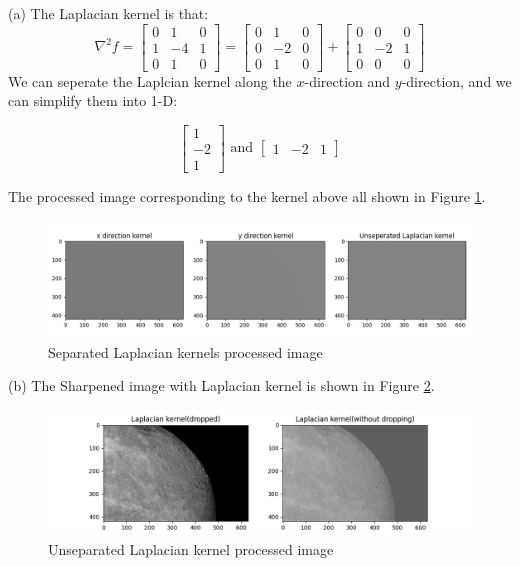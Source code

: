 \problem{}
(a) The Laplacian kernel is that:
$$
\nabla^2 f = \begin{bmatrix}
    0 & 1 & 0 \\
    1 & -4 & 1 \\
    0 & 1 & 0
\end{bmatrix}
=
\begin{bmatrix}
    0 & 1 & 0 \\
    0 & -2 & 0 \\
    0 & 1 & 0
\end{bmatrix}
+
\begin{bmatrix}
    0 & 0 & 0 \\
    1 & -2 & 1 \\
    0 & 0 & 0
\end{bmatrix}
$$
We can seperate the Laplcian kernel along the $x$-direction and $y$-direction, and we can simplify them into 1-D:

$$\begin{bmatrix}1\\-2\\1\end{bmatrix} \text{\ \ and \ \ } \begin{bmatrix}1 & -2 & 1\end{bmatrix}$$

The processed image corresponding to the kernel above all shown in Figure \ref{fig:p2a}.\\

\begin{figure}[htbp]
    \centering
	\includegraphics[width=1\textwidth]{../images/p2/p2a.png}
    \caption{Separated Laplacian kernels processed image}
\label{fig:p2a}
\end{figure}


(b) The Sharpened image with Laplacian kernel is shown in Figure \ref{fig:p2b}.\\
\begin{figure}[htbp]
    \centering
    \includegraphics[width=\textwidth]{../images/p2/p2b.png}
    \caption{Unseparated Laplacian kernel processed image}
\label{fig:p2b}
\end{figure}

